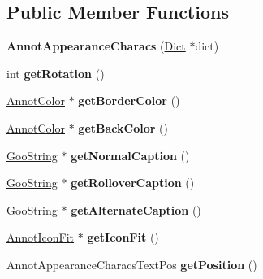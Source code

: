 \subsection*{Public Member Functions}
\begin{DoxyCompactItemize}
\item 
\mbox{\label{class_annot_appearance_characs_acd44e59d65c9d431d5c0712352ed34dd}} 
{\bfseries Annot\+Appearance\+Characs} (\hyperlink{class_dict}{Dict} $\ast$dict)
\item 
\mbox{\label{class_annot_appearance_characs_a43f72d7b3876fbd91c38e1410e55fa59}} 
int {\bfseries get\+Rotation} ()
\item 
\mbox{\label{class_annot_appearance_characs_a56cd83e8a1986fda9c2e0bc6aa79ae3b}} 
\hyperlink{class_annot_color}{Annot\+Color} $\ast$ {\bfseries get\+Border\+Color} ()
\item 
\mbox{\label{class_annot_appearance_characs_ae81a34b2513e3db4e4c976f40bb25777}} 
\hyperlink{class_annot_color}{Annot\+Color} $\ast$ {\bfseries get\+Back\+Color} ()
\item 
\mbox{\label{class_annot_appearance_characs_a6404c355935f06c85b9a6eea2d965ebe}} 
\hyperlink{class_goo_string}{Goo\+String} $\ast$ {\bfseries get\+Normal\+Caption} ()
\item 
\mbox{\label{class_annot_appearance_characs_a156f29115d9846cf6cfd9b95d70e3116}} 
\hyperlink{class_goo_string}{Goo\+String} $\ast$ {\bfseries get\+Rollover\+Caption} ()
\item 
\mbox{\label{class_annot_appearance_characs_abcaf1a482b788cba3db48559b39472b9}} 
\hyperlink{class_goo_string}{Goo\+String} $\ast$ {\bfseries get\+Alternate\+Caption} ()
\item 
\mbox{\label{class_annot_appearance_characs_ab71464dc95441e137f0ab852fe2d2d07}} 
\hyperlink{class_annot_icon_fit}{Annot\+Icon\+Fit} $\ast$ {\bfseries get\+Icon\+Fit} ()
\item 
\mbox{\label{class_annot_appearance_characs_aeadab136658dcbff25603ec40c9e7994}} 
Annot\+Appearance\+Characs\+Text\+Pos {\bfseries get\+Position} ()
\end{DoxyCompactItemize}
